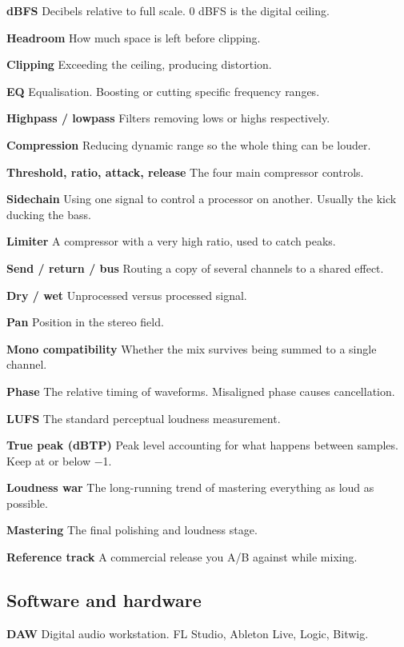 \textbf{dBFS} Decibels relative to full scale. 0 dBFS is the digital ceiling.

\textbf{Headroom} How much space is left before clipping.

\textbf{Clipping} Exceeding the ceiling, producing distortion.

\textbf{EQ} Equalisation. Boosting or cutting specific frequency ranges.

\textbf{Highpass / lowpass} Filters removing lows or highs respectively.

\textbf{Compression} Reducing dynamic range so the whole thing can be louder.

\textbf{Threshold, ratio, attack, release} The four main compressor controls.

\textbf{Sidechain} Using one signal to control a processor on another. Usually the kick ducking
the bass.

\textbf{Limiter} A compressor with a very high ratio, used to catch peaks.

\textbf{Send / return / bus} Routing a copy of several channels to a shared effect.

\textbf{Dry / wet} Unprocessed versus processed signal.

\textbf{Pan} Position in the stereo field.

\textbf{Mono compatibility} Whether the mix survives being summed to a single channel.

\textbf{Phase} The relative timing of waveforms. Misaligned phase causes cancellation.

\textbf{LUFS} The standard perceptual loudness measurement.

\textbf{True peak (dBTP)} Peak level accounting for what happens between samples. Keep at or
below −1.

\textbf{Loudness war} The long-running trend of mastering everything as loud as possible.

\textbf{Mastering} The final polishing and loudness stage.

\textbf{Reference track} A commercial release you A/B against while mixing.

\subsection{Software and hardware}\label{th09_glossary-software-and-hardware}

\textbf{DAW} Digital audio workstation. FL Studio, Ableton Live, Logic, Bitwig.

